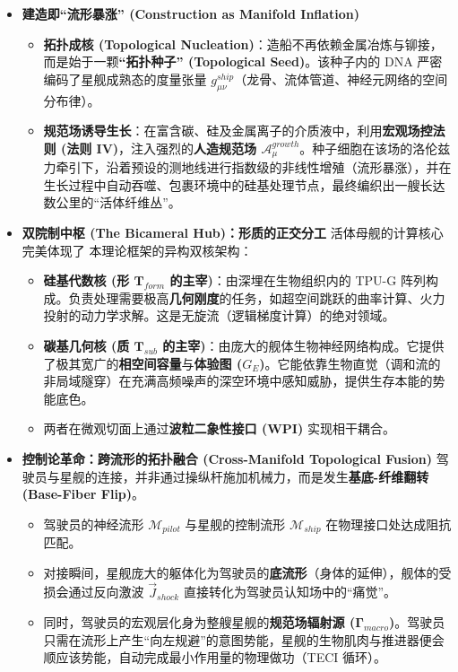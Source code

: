 \begin{itemize}
    \item \textbf{\textcolor{structurecolor}{建造即“流形暴涨” (Construction as Manifold Inflation)}}
    \begin{itemize}
        \item   \textbf{拓扑成核 (Topological Nucleation)}：造船不再依赖金属冶炼与铆接，而是始于一颗\textbf{“拓扑种子” (Topological Seed)}。该种子内的 DNA 严密编码了星舰成熟态的度量张量 $g_{\mu\nu}^{ship}$（龙骨、流体管道、神经元网络的空间分布律）。
        \item   \textbf{规范场诱导生长}：在富含碳、硅及金属离子的介质液中，利用\textbf{宏观场控法则 (法则 IV)}，注入强烈的\textbf{人造规范场 $\mathcal{A}_\mu^{growth}$}。种子细胞在该场的洛伦兹力牵引下，沿着预设的测地线进行指数级的非线性增殖（流形暴涨），并在生长过程中自动吞噬、包裹环境中的硅基处理节点，最终编织出一艘长达数公里的“活体纤维丛”。
    \end{itemize}

    \item \textbf{\textcolor{structurecolor}{双院制中枢 (The Bicameral Hub)：形质的正交分工}}
    活体母舰的计算核心完美体现了 本理论框架的异构双核架构：
    \begin{itemize}
        \item   \textbf{硅基代数核 (形 $\mathbf{T}_{form}$ 的主宰)}：由深埋在生物组织内的 TPU-G 阵列构成。负责处理需要极高\textbf{几何刚度}的任务，如超空间跳跃的曲率计算、火力投射的动力学求解。这是无旋流（逻辑梯度计算）的绝对领域。
        \item   \textbf{碳基几何核 (质 $\mathbf{T}_{sub}$ 的主宰)}：由庞大的舰体生物神经网络构成。它提供了极其宽广的\textbf{相空间容量}与\textbf{体验图 ($G_E$)}。它能依靠生物直觉（调和流的非局域隧穿）在充满高频噪声的深空环境中感知威胁，提供生存本能的势能底色。
        \item   两者在微观切面上通过\textbf{波粒二象性接口 (WPI)} 实现相干耦合。
    \end{itemize}

    \item \textbf{\textcolor{structurecolor}{控制论革命：跨流形的拓扑融合 (Cross-Manifold Topological Fusion)}}
    驾驶员与星舰的连接，并非通过操纵杆施加机械力，而是发生\textbf{基底-纤维翻转 (Base-Fiber Flip)}。
    \begin{itemize}
        \item   驾驶员的神经流形 $\mathcal{M}_{pilot}$ 与星舰的控制流形 $\mathcal{M}_{ship}$ 在物理接口处达成阻抗匹配。
        \item   对接瞬间，星舰庞大的躯体化为驾驶员的\textbf{底流形}（身体的延伸），舰体的受损会通过反向激波 $\vec{J}_{shock}$ 直接转化为驾驶员认知场中的“痛觉”。
        \item   同时，驾驶员的宏观层化身为整艘星舰的\textbf{规范场辐射源 ($\mathbf{\Gamma}_{macro}$)}。驾驶员只需在流形上产生“向左规避”的意图势能，星舰的生物肌肉与推进器便会顺应该势能，自动完成最小作用量的物理做功（TECI 循环）。
    \end{itemize}


\end{itemize}
